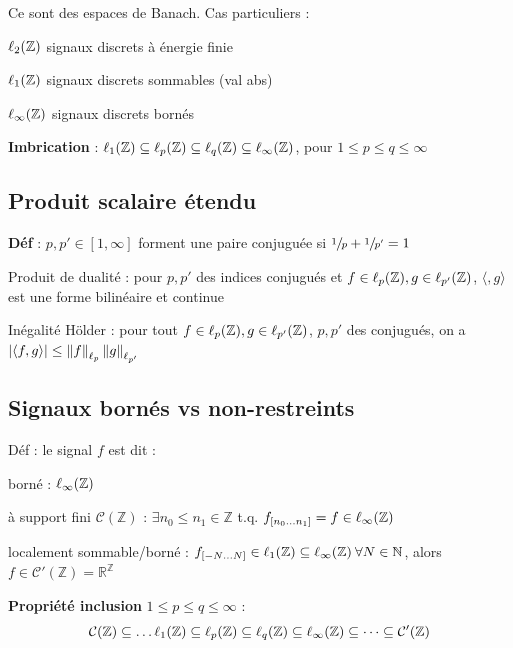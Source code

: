 Ce sont des espaces de Banach. Cas particuliers :

\begin{myitemize}
    \item $\ell_{2}(\mathbb{Z})$ signaux discrets à énergie finie
    \item $\ell_{1}(\mathbb{Z})$ signaux discrets sommables (val abs)
    \item $\ell_{\infty}(\mathbb{Z})$ signaux discrets bornés
\end{myitemize}

\textbf{Imbrication} : $\ell_{1}(\mathbb{Z}) \subseteq \ell_{p}(\mathbb{Z}) \subseteq \ell_{q}(\mathbb{Z}) \subseteq \ell_{\infty}(\mathbb{Z})$, pour $1\leq p \leq q \leq \infty$

\subsection*{Produit scalaire étendu}

\textbf{Déf} : $p,p' \in [1,\infty]$ forment une paire conjuguée si $\sfrac{1}{p} + \sfrac{1}{p'} = 1$

\begin{myitemize}
    \item Produit de dualité : pour $p,p'$ des indices conjugués et $f\in\ell_{p}(\mathbb{Z}), g\in\ell_{p'}(\mathbb{Z})$, $\langle ,g \rangle$ est une forme bilinéaire et continue
    
    \item Inégalité Hölder : pour tout $f\in\ell_{p}(\mathbb{Z}), g\in\ell_{p'}(\mathbb{Z})$, $p,p'$ des conjugués, on a $|\langle f,g \rangle| \leq \left\lVert f\right\rVert_{\ell_{p}}\left\lVert g\right\rVert_{\ell_{p'}}$
\end{myitemize}

\subsection*{Signaux bornés vs non-restreints}

Déf : le signal $f$ est dit : 
\begin{myitemize}
    \item borné : $\ell_{\infty}(\mathbb{Z})$
    \item à support fini $\mathcal{C}(\mathbb{Z})$ : $\exists n_0 \leq n_1 \in \mathbb{Z}$ t.q. $f_{[n_0\dots n_1]} = f \in \ell_{\infty}(\mathbb{Z})$
    \item localement sommable/borné : $f_{[-N\dots N]} \in \ell_{1}(\mathbb{Z}) \subseteq \ell_{\infty}(\mathbb{Z}) \: \forall N\in\mathbb{N}$, alors $f \in\mathcal{C'}(\mathbb{Z})=\mathbb{R}^\mathbb{Z}$
\end{myitemize}

\textbf{Propriété inclusion} $1\leq p\leq q \leq \infty$ : 
\begin{equation*}
    \mathcal{C}(\mathbb{Z}) \subseteq \dots \ell_{1}(\mathbb{Z}) \subseteq \ell_{p}(\mathbb{Z}) \subseteq \ell_{q}(\mathbb{Z}) \subseteq \ell_{\infty}(\mathbb{Z}) \subseteq \dots \subseteq \mathcal{C'}(\mathbb{Z})
\end{equation*}

